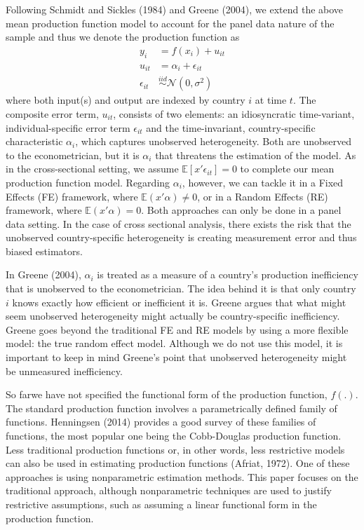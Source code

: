 \documentclass[12pt,a4paper]{article}\usepackage[]{graphicx}\usepackage[]{color}
\begin{document}
Following Schmidt and Sickles (1984) and Greene (2004), we extend the above mean production function model to account for the panel data nature of the sample and thus we denote the production function as
$$
\begin{aligned}
y_i & = f(x_i) + u_{it} \\
u_{it} & = \alpha_i + \epsilon_{it} \\
\epsilon_{it} & \overset{iid}{\sim} \mathcal{N}(0, \sigma ^2)
\end{aligned}
$$
where both input(s) and output are indexed by country $i$ at time $t$. The composite error term, $u_{it}$, consists of two elements: an idiosyncratic time-variant, individual-specific error term $\epsilon_{it}$ and the time-invariant, country-specific characteristic $\alpha_i$, which captures unobserved heterogeneity. Both are unobserved to the econometrician, but it is $\alpha_i$ that threatens the estimation of the model. As in the cross-sectional setting, we assume $\mathbb{E}[x' \epsilon_{it}]=0$ to complete our mean production function model. Regarding $\alpha_i$, however, we can tackle it in a Fixed Effects (FE) framework, where $\mathbb{E}(x' \alpha) \neq 0$, or in a Random Effects (RE) framework, where $\mathbb{E}(x' \alpha) = 0$. Both approaches can only be done in a panel data setting. In the case of cross sectional analysis, there exists the risk that the unobserved country-specific heterogeneity is creating measurement error and thus biased estimators. 

In Greene (2004), $\alpha_i$ is treated as a measure of a country's production inefficiency that is unobserved to the econometrician. The idea behind it is that only country $i$ knows exactly how efficient or inefficient it is. Greene argues that what might seem unobserved heterogeneity might actually be country-specific inefficiency. Greene goes beyond the traditional FE and RE models by using a more flexible model: the true random effect model. Although we do not use this model, it is important to keep in mind Greene's point that unobserved heterogeneity might be unmeasured inefficiency.

So farwe have not specified the functional form of the production function, $f(.)$. The standard production function involves a parametrically defined family of functions. Henningsen (2014) provides a good survey of these families of functions, the most popular one being the Cobb-Douglas production function. Less traditional production functions or, in other words, less restrictive models can also be used in estimating production functions (Afriat, 1972). One of these approaches is using nonparametric estimation methods. This paper focuses on the traditional approach, although nonparametric techniques are used to justify restrictive assumptions, such as assuming a linear functional form in the production function.
\end{document}

